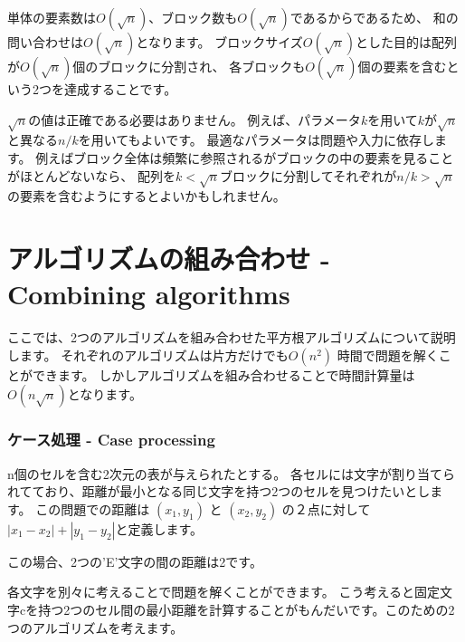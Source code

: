 単体の要素数は$O(\sqrt n)$、ブロック数も$O(\sqrt n)$であるからであるため、
和の問い合わせは$O(\sqrt n)$となります。
ブロックサイズ$O(\sqrt n)$とした目的は配列が$O(\sqrt n)$個のブロックに分割され、
各ブロックも$O(\sqrt n)$個の要素を含むという2つを達成することです。

$\sqrt n$の値は正確である必要はありません。
例えば、パラメータ$k$を用いて$k$が$\sqrt n$と異なる$n/k$を用いてもよいです。
最適なパラメータは問題や入力に依存します。
例えばブロック全体は頻繁に参照されるがブロックの中の要素を見ることがほとんどないなら、
配列を$k < \sqrt n$ブロックに分割してそれぞれが$n/k > \sqrt n$の要素を含むようにするとよいかもしれません。

\section{アルゴリズムの組み合わせ - Combining algorithms}

ここでは、2つのアルゴリズムを組み合わせた平方根アルゴリズムについて説明します。
それぞれのアルゴリズムは片方だけでも$O(n^2)$ 時間で問題を解くことができます。
しかしアルゴリズムを組み合わせることで時間計算量は$O(n \sqrt n)$となります。

\subsubsection{ケース処理 - Case processing}

n個のセルを含む2次元の表が与えられたとする。
各セルには文字が割り当てられてており、距離が最小となる同じ文字を持つ2つのセルを見つけたいとします。
この問題での距離は
$(x_1,y_1)$ と $(x_2,y_2)$ の２点に対して $|x_1-x_2|+|y_1-y_2|$と定義します。

\begin{center}
\end{center}
この場合、2つの'E'文字の間の距離は2です。

各文字を別々に考えることで問題を解くことができます。
こう考えると固定文字cを持つ2つのセル間の最小距離を計算することがもんだいです。このための2つのアルゴリズムを考えます。

